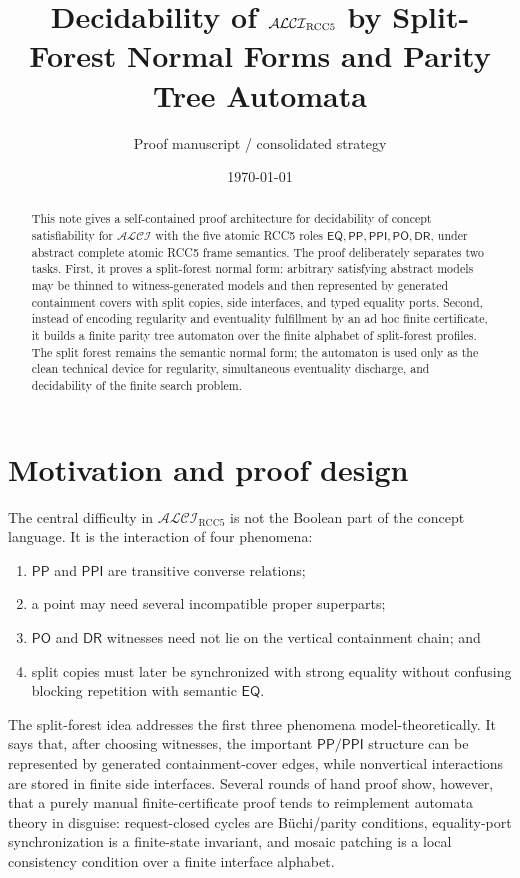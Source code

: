 \documentclass[11pt]{article}
\title{Decidability of $\ALCI_{\RCC}$ by Split-Forest Normal Forms and Parity Tree Automata}
\author{Proof manuscript / consolidated strategy}
\date{\today}
\newcommand{\ALCI}{\mathcal{ALCI}}
\newcommand{\RCC}{\mathrm{RCC5}}
\newcommand{\EQ}{\mathsf{EQ}}
\newcommand{\PP}{\mathsf{PP}}
\newcommand{\PPI}{\mathsf{PPI}}
\newcommand{\PO}{\mathsf{PO}}
\newcommand{\DR}{\mathsf{DR}}
\begin{document}
\maketitle

\begin{abstract}
This note gives a self-contained proof architecture for decidability of concept satisfiability for $\ALCI$ with the five atomic RCC5 roles $\EQ,\PP,\PPI,\PO,\DR$, under abstract complete atomic RCC5 frame semantics.  The proof deliberately separates two tasks.  First, it proves a split-forest normal form: arbitrary satisfying abstract models may be thinned to witness-generated models and then represented by generated containment covers with split copies, side interfaces, and typed equality ports.  Second, instead of encoding regularity and eventuality fulfillment by an ad hoc finite certificate, it builds a finite parity tree automaton over the finite alphabet of split-forest profiles.  The split forest remains the semantic normal form; the automaton is used only as the clean technical device for regularity, simultaneous eventuality discharge, and decidability of the finite search problem.
\end{abstract}

\tableofcontents

\section{Motivation and proof design}

The central difficulty in $\ALCI_{\RCC}$ is not the Boolean part of the concept language.  It is the interaction of four phenomena:
\begin{enumerate}[label=(\roman*)]
\item $\PP$ and $\PPI$ are transitive converse relations;
\item a point may need several incompatible proper superparts;
\item $\PO$ and $\DR$ witnesses need not lie on the vertical containment chain; and
\item split copies must later be synchronized with strong equality without confusing blocking repetition with semantic $\EQ$.
\end{enumerate}

The split-forest idea addresses the first three phenomena model-theoretically.  It says that, after choosing witnesses, the important $\PP/\PPI$ structure can be represented by generated containment-cover edges, while nonvertical interactions are stored in finite side interfaces.  Several rounds of hand proof show, however, that a purely manual finite-certificate proof tends to reimplement automata theory in disguise: request-closed cycles are Büchi/parity conditions, equality-port synchronization is a finite-state invariant, and mosaic patching is a local consistency condition over a finite interface alphabet.
\end{document}
